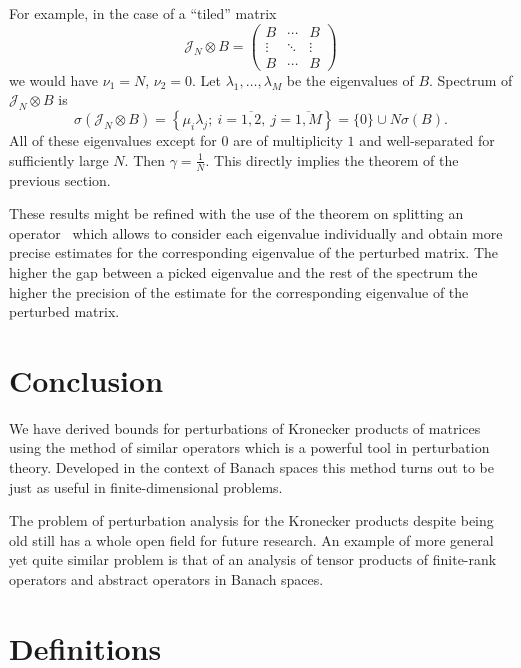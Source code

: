 \documentclass[14pt,a4paper]{extarticle}
\theoremstyle{definition}
\begin{document}
For example, in the case of a ``tiled'' matrix
\[
    \mathcal{J}_N{\otimes}B =
    \begin{pmatrix}
        B & \cdots & B \\
        \vdots & \ddots & \vdots \\
        B & \cdots & B
    \end{pmatrix}
\]
    we would have
    \( \nu_1=N \),
    \( \nu_2=0 \).
Let \( \lambda_1,\ldots,\lambda_M \)
    be the eigenvalues of \( B \).
Spectrum of \( \mathcal{J}_N{\otimes}B \) is
    \[
        \sigma(\mathcal{J}_N{\otimes}B) = \left\{ \mu_i\lambda_j;\ i{=}\overline{1,2},\ j{=}\overline{1,M}\right\} = \{0\}\cup N\sigma(B).
    \]
All of these eigenvalues except for \( 0 \)
    are of multiplicity \( 1 \)
    and well-separated for sufficiently large \( N \).
Then \( \gamma=\frac1N \).
This directly implies the theorem of the previous section.

These results might be refined
    with the use of the theorem on splitting an operator~\cite{baskakov1987theorem}
    which allows to consider each eigenvalue individually
    and obtain more precise estimates for the corresponding
    eigenvalue of the perturbed matrix.
The higher the gap between a picked eigenvalue
    and the rest of the spectrum
    the higher the precision of the estimate
    for the corresponding eigenvalue of the perturbed matrix.

\section{Conclusion}

We have derived bounds
    for perturbations of Kronecker products
    of matrices using the method of similar operators
    which is a powerful tool in perturbation theory.
Developed in the context of Banach spaces
    this method turns out to be just as useful
    in finite-dimensional problems.

The problem of perturbation analysis for the Kronecker products
    despite being old still has a whole open field for future research.
An example of more general yet quite similar problem
    is that of an analysis of tensor products
    of finite-rank operators
    and abstract operators in Banach spaces.

\newpage
\appendix
\section{Definitions}
\end{document}
